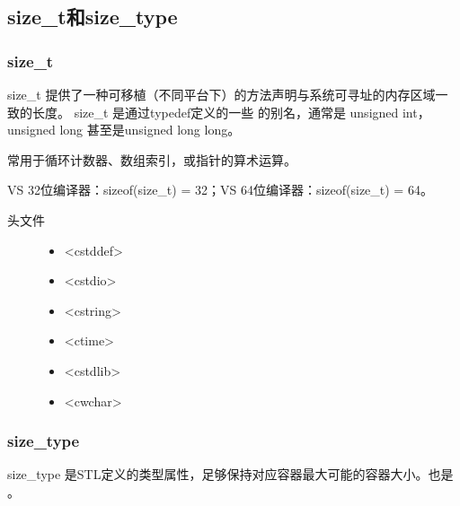 \documentclass[letterpaper,10pt,english]{sphinxmanual}
\begin{document}
\subsection{size\_t和size\_type}
\label{\detokenize{cpp/19_stl:size-tsize-type}}

\subsubsection{size\_t}
\label{\detokenize{cpp/19_stl:size-t}}
size\_t 提供了一种可移植（不同平台下）的方法声明与系统可寻址的内存区域一致的长度。
size\_t 是通过typedef定义的一些  的别名，通常是 unsigned int，unsigned long 甚至是unsigned long long。

常用于循环计数器、数组索引，或指针的算术运算。

VS 32位编译器：sizeof(size\_t) = 32；VS 64位编译器：sizeof(size\_t) = 64。
\begin{description}
\item[{头文件}] \leavevmode\begin{itemize}
\item {} 
\textless{}cstddef\textgreater{}

\item {} 
\textless{}cstdio\textgreater{}

\item {} 
\textless{}cstring\textgreater{}

\item {} 
\textless{}ctime\textgreater{}

\item {} 
\textless{}cstdlib\textgreater{}

\item {} 
\textless{}cwchar\textgreater{}

\end{itemize}

\end{description}


\subsubsection{size\_type}
\label{\detokenize{cpp/19_stl:size-type}}
size\_type 是STL定义的类型属性，足够保持对应容器最大可能的容器大小。也是  。
\end{document}
